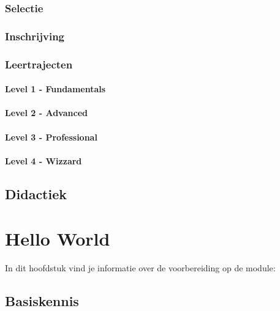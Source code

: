 \documentclass[]{book}
\begin{document}
\subsection{Selectie}\label{selectie}

\subsection{Inschrijving}\label{inschrijving}

\subsection{Leertrajecten}\label{leertrajecten}

\subsubsection{Level 1 - Fundamentals}\label{level-1---fundamentals}

\subsubsection{Level 2 - Advanced}\label{level-2---advanced}

\subsubsection{Level 3 - Professional}\label{level-3---professional}

\subsubsection{Level 4 - Wizzard}\label{level-4---wizzard}

\section{Didactiek}\label{didactiek}

\chapter{Hello World}\label{hello-world}

In dit hoofdstuk vind je informatie over de voorbereiding op de module:

\section{Basiskennis}\label{basiskennis}
\end{document}
